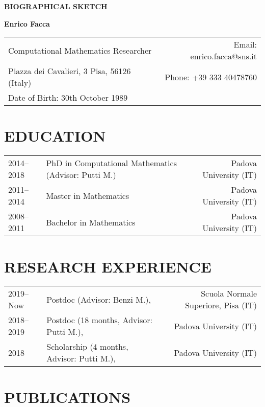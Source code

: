 \documentclass[12pt]{article}
\begin{document}
\pagestyle{CVfooter}

\noindent \textbf{\uppercase{Biographical Sketch}}
\vspace{2mm}

\noindent \textbf{Enrico Facca}
\vspace{1mm}

\noindent\begin{tabular*}{\textwidth}{@{\extracolsep{\fill}}l r}
Computational Mathematics Researcher & Email: enrico.facca@sns.it\\
Piazza dei Cavalieri, 3 Pisa, 56126 (Italy) & Phone: +39 333 40478760  \\
Date of Birth: 30th October 1989  & \\
\hline
\end{tabular*}

\section{\uppercase{Education}}

\begin{tabular}{l l r}
2014--2018 &PhD in Computational Mathematics (Advisor: Putti M.)  &Padova University (IT)  \\
2011--2014 &Master in Mathematics  &Padova University (IT) \\
2008--2011 &Bachelor in Mathematics &Padova University (IT)  \\
\end{tabular}

\section{\uppercase{Research Experience}}
\begin{tabular}{l l r}
2019--Now  & Postdoc (Advisor: Benzi M.), &Scuola Normale Superiore, Pisa (IT)\\
2018--2019 & Postdoc  (18 months, Advisor: Putti M.), &Padova University (IT)\\
2018 & Scholarship (4 months, Advisor: Putti M.), &Padova University (IT)\\
\end{tabular}

\section{\uppercase{Publications}}

\end{document}
